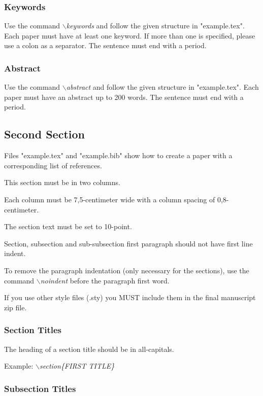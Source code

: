 \documentclass[a4paper,twoside]{article}
\begin{document}
\subsubsection{Keywords}

Use the command \textit{$\backslash$keywords} and follow the given structure in "example.tex". Each paper must have at least one keyword. If more than one is specified, please use a colon as a separator. The sentence must end with a period.

\subsubsection{Abstract}

Use the command \textit{$\backslash$abstract} and follow the given structure in "example.tex".
Each paper must have an abstract up to 200 words. The sentence
must end with a period.

\subsection{Second Section}

Files "example.tex" and "example.bib" show how to create a paper
with a corresponding list of references.

This section must be in two columns.

Each column must be 7,5-centimeter wide with a column spacing
of 0,8-centimeter.

The section text must be set to 10-point.

Section, subsection and sub-subsection first paragraph should not
have first line indent.

To remove the paragraph indentation (only necessary for the
sections), use the command \textit{$\backslash$noindent} before the
paragraph first word.

If you use other style files (.sty) you MUST include them in the
final manuscript zip file.

\subsubsection{Section Titles}

The heading of a section title should be in all-capitals.

Example: \textit{$\backslash$section\{FIRST TITLE\}}

\subsubsection{Subsection Titles}
\end{document}
